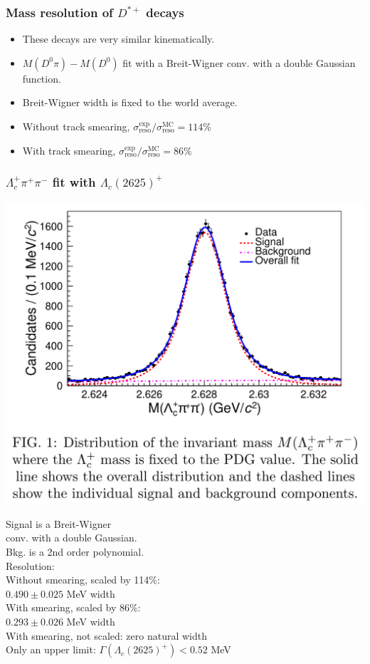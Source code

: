 \documentclass[10pt, aspectratio=169]{beamer}
\def\Dstarp{{D^{*+}}{}}
\def\Dz{{D^{0}}{}}
\def\Lc{{\Lambda_c^+}}
\def\LcII{{\Lambda_c(2625)^+}}
\def\pip{{\pi^+}}
\def\pim{{\pi^-}}
\def\Dz{{D^0}}
\begin{document}
\begin{frame}[label=resolution-lc2625]%
  \frametitle{Mass resolution of $\Dstarp$ decays}
  \large
  \begin{itemize}
    \item These decays are very similar kinematically.
    \item $M(\Dz\pi) - M(\Dz)$ fit with a Breit-Wigner conv.
      with a double Gaussian function.
    \item Breit-Wigner width is fixed to the world average.
    \item Without track smearing,
      $\sigma_\text{reso}^\text{exp} /
      \sigma_\text{reso}^\text{MC} = 114\%$
    \item With track smearing,
      $\sigma_\text{reso}^\text{exp} /
      \sigma_\text{reso}^\text{MC} = 86\%$
  \end{itemize}
\end{frame}%

\begin{frame}[label=lcpipi-fit]%
  \frametitle{$\Lc\pip\pim$ fit with $\LcII$}
  \centering
  \parbox{.45\linewidth}{
    \includegraphics[width=.4\textwidth]{figures/005/fig2-001}
  } \parbox{.51\linewidth}{
    Signal is a Breit-Wigner
    \\conv. with a double Gaussian.
    \\ Bkg. is a 2nd order polynomial.
    \\[2ex]
    Resolution: \\[1ex]
    Without smearing, scaled by 114\%:
    \\ $0.490 \pm 0.025$ MeV width
    \\[1ex]
    With smearing, scaled by 86\%:
    \\ $0.293 \pm 0.026$ MeV width
    \\[1ex]
    With smearing, not scaled:
    zero natural width
    \\ \vfill
    Only an upper limit: $\Gamma(\LcII) < 0.52$ MeV
  }
\end{frame}%
\end{document}
